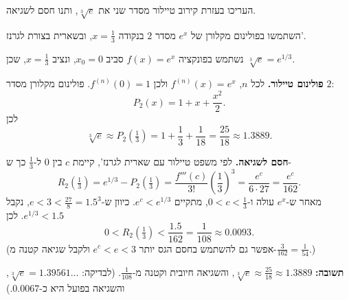 
\begin{question}
העריכו בעזרת קירוב טיילור מסדר שני את $\sqrt[3]{e}$, ותנו חסם לשגיאה.
\end{question}

\begin{hint}
השתמשו בפולינום מקלורן של $e^x$ מסדר $2$ בנקודה $x=\frac13$, ובשארית בצורת לגרנז'.
\end{hint}

\begin{solution}
נשתמש בפונקציה $f(x)=e^x$ סביב $x_0=0$, ונציב $x=\frac13$, שכן $\sqrt[3]{e}=e^{1/3}$.

\textbf{פולינום טיילור.} לכל $n$, $f^{(n)}(x)=e^x$ ולכן $f^{(n)}(0)=1$. פולינום מקלורן מסדר $2$:
\[ P_2(x)=1+x+\frac{x^2}{2}. \]
לכן
\[ \sqrt[3]{e}\approx P_2\!\left(\tfrac13\right)=1+\frac13+\frac1{18}=\frac{25}{18}\approx1.3889. \]

\textbf{חסם לשגיאה.} לפי משפט טיילור עם שארית לגרנז', קיימת $c$ בין $0$ ל-$\frac13$ כך ש-
\[ R_2\!\left(\tfrac13\right)=e^{1/3}-P_2\!\left(\tfrac13\right)=\frac{f'''(c)}{3!}\left(\frac13\right)^3=\frac{e^c}{6\cdot27}=\frac{e^c}{162}. \]
מאחר ש-$e^x$ עולה ו-$0<c<\frac13$, מתקיים $e^c<e^{1/3}$. כיוון ש-$e<3<\frac{27}{8}=1.5^3$, נקבל $e^{1/3}<1.5$. לכן
\[ 0<R_2\!\left(\tfrac13\right)<\frac{1.5}{162}=\frac1{108}\approx0.0093. \]
(אפשר גם להשתמש בחסם הגס יותר $e^c<e<3$ ולקבל שגיאה קטנה מ-$\frac{3}{162}=\frac1{54}$.)

\textbf{תשובה:} $\sqrt[3]{e}\approx\frac{25}{18}\approx1.3889$, והשגיאה חיובית וקטנה מ-$\frac1{108}$. (לבדיקה: $\sqrt[3]{e}=1.39561\ldots$, והשגיאה בפועל היא כ-$0.0067$.)
\end{solution}
